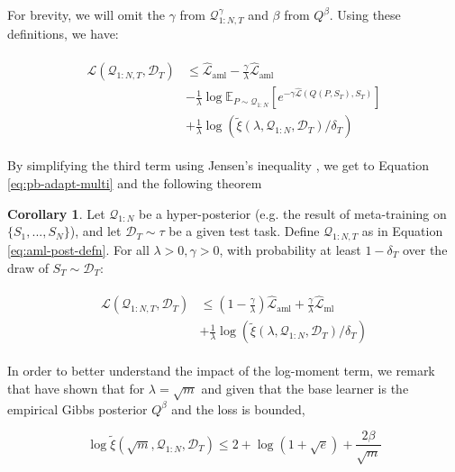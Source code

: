 \documentclass[letterpaper]{article} %
\theoremstyle{definition}
\newtheorem{corollary}[theorem]{Corollary}
\begin{document}
For brevity, we will omit the $\gamma$ from $\mathcal{Q}^{\gamma}_{1:N,T}$ and $\beta$ from $Q^{\beta}$. Using these definitions, we have:

\begin{align*} 
\begin{split}
\mathcal{L}(\mathcal{Q}_{1:N,T}, \mathcal{D}_T) &\leq \hat{\mathcal{L}}_{\mathrm{aml}} -\frac{\gamma}{\lambda}\hat{\mathcal{L}}_{\mathrm{aml}} \\
&- \frac{1}{\lambda}\log \mathbb{E}_{P\sim \mathcal{Q}_{1:N}}\left [e^{-\gamma\hat{\mathcal{L}}(Q(P,S_T),S_T)}\right ]\\
&+\frac{1}{\lambda}\log\left (\tilde{\xi}(\lambda,\mathcal{Q}_{1:N},\mathcal{D}_T)/\delta_T\right )
\end{split}
\end{align*}

By simplifying the third term using Jensen's inequality , we get to Equation \ref{eq:pb-adapt-multi} and the following theorem

\begin{corollary} \label{thm:main-result-gibbs}
	Let $\mathcal{Q}_{1:N}$ be a hyper-posterior (e.g. the result of meta-training on $\{S_1,...,S_N\}$), and let $\mathcal{D}_T\sim \tau$ be a given test task. Define  $\mathcal{Q}_{1:N,T}$ as in Equation \ref{eq:aml-post-defn}. 
	For all $\lambda>0, \gamma>0$, 
	with probability at least $1-\delta_T$ over the draw of $S_T\sim \mathcal{D}_T$:
	
	\begin{align} \label{eq:pb-adapt-multi}
	\begin{split}
	\mathcal{L}(\mathcal{Q}_{1:N,T}, \mathcal{D}_T) &\leq 
	(1-\frac{\gamma}{\lambda})\hat{\mathcal{L}}_{\mathrm{aml}} + \frac{\gamma}{\lambda}\hat{\mathcal{L}}_{\mathrm{ml}} \\
	&+\frac{1}{\lambda}\log\left (\tilde{\xi}(\lambda,\mathcal{Q}_{1:N},\mathcal{D}_T)/\delta_T\right )
	\end{split}
	\end{align}
\end{corollary}

In order to better understand the impact of the log-moment term, we remark that \citet{Rivasplata2020} have shown that for $\lambda=\sqrt{m}$ and given that the base learner is the empirical Gibbs posterior $Q^\beta$ and the loss is bounded,

$$\log\tilde{\xi}(\sqrt{m},\mathcal{Q}_{1:N},\mathcal{D}_T) \leq 2+\log(1+\sqrt{e})+\frac{2\beta}{\sqrt{m}} $$
\end{document}
